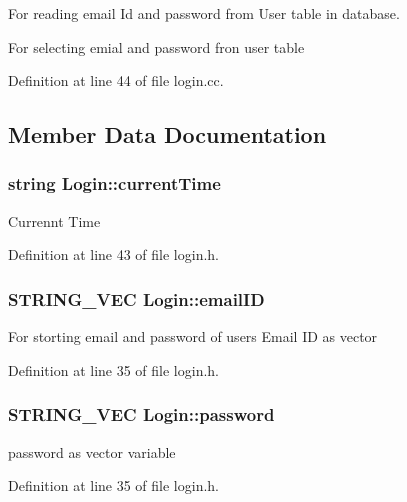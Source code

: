 For reading email Id and password from User table in database. 

For selecting emial and password fron user table 

Definition at line 44 of file login.\-cc.



\subsection{Member Data Documentation}
\hypertarget{classLogin_a624f15ecf989648b73a91743f67a6880}{
\subsubsection[{current\-Time}]{\setlength{\rightskip}{0pt plus 5cm}string Login\-::current\-Time\hspace{0.3cm}{\ttfamily [protected]}}}\label{classLogin_a624f15ecf989648b73a91743f67a6880}
Currennt Time 

Definition at line 43 of file login.\-h.

\hypertarget{classLogin_abea56d6d6403f1e627294f222dd77310}{
\subsubsection[{email\-I\-D}]{\setlength{\rightskip}{0pt plus 5cm}S\-T\-R\-I\-N\-G\-\_\-\-V\-E\-C Login\-::email\-I\-D\hspace{0.3cm}{\ttfamily [protected]}}}\label{classLogin_abea56d6d6403f1e627294f222dd77310}
For storting email and password of users Email I\-D as vector 

Definition at line 35 of file login.\-h.

\hypertarget{classLogin_a39f7fd03b2b27c927c657ee73e7fcbbc}{
\subsubsection[{password}]{\setlength{\rightskip}{0pt plus 5cm}S\-T\-R\-I\-N\-G\-\_\-\-V\-E\-C Login\-::password\hspace{0.3cm}{\ttfamily [protected]}}}\label{classLogin_a39f7fd03b2b27c927c657ee73e7fcbbc}
password as vector variable 

Definition at line 35 of file login.\-h.

